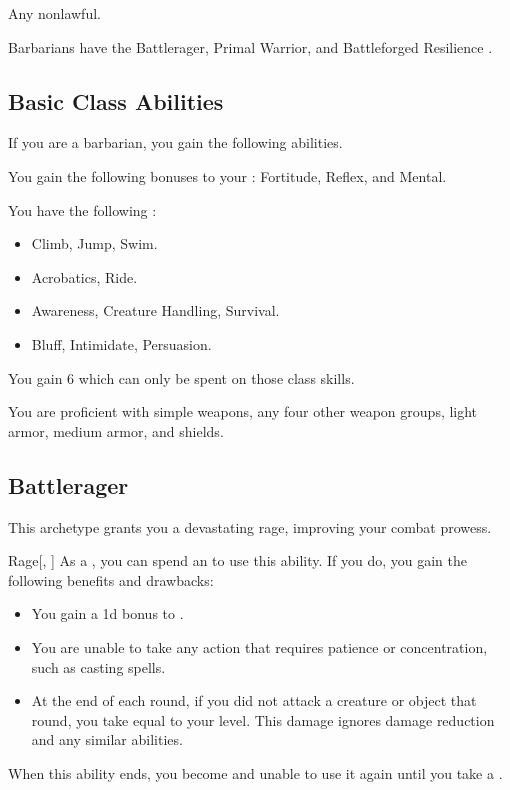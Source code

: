      Any nonlawful.

     Barbarians have the Battlerager, Primal Warrior, and Battleforged Resilience .

    \subsection{Basic Class Abilities}
        If you are a barbarian, you gain the following abilities.

        You gain the following bonuses to your :  Fortitude,  Reflex, and  Mental.

        You have the following :
        \begin{itemize}
            \item {} Climb, Jump, Swim.
            \item {} Acrobatics, Ride.
            \item {} Awareness, Creature Handling, Survival.
            \item {} Bluff, Intimidate, Persuasion.
        \end{itemize}
        You gain 6  which can only be spent on those class skills.

        You are proficient with simple weapons, any four other weapon groups, light armor, medium armor, and shields.

    \subsection{Battlerager}\label{Rage}
        This archetype grants you a devastating rage, improving your combat prowess.

        \begin{ability}{Rage}[, ]
            As a , you can spend an  to use this ability.
            If you do, you gain the following benefits and drawbacks:
            \begin{itemize}
                \item You gain a \plus1d bonus to .
                \item You are unable to take any action that requires patience or concentration, such as casting spells.
                \item At the end of each round, if you did not attack a creature or object that round, you take  equal to your level.
                    This damage ignores damage reduction and any similar abilities.
            \end{itemize}
            When this ability ends, you become \fatigued and unable to use it again until you take a .
        \end{ability}

